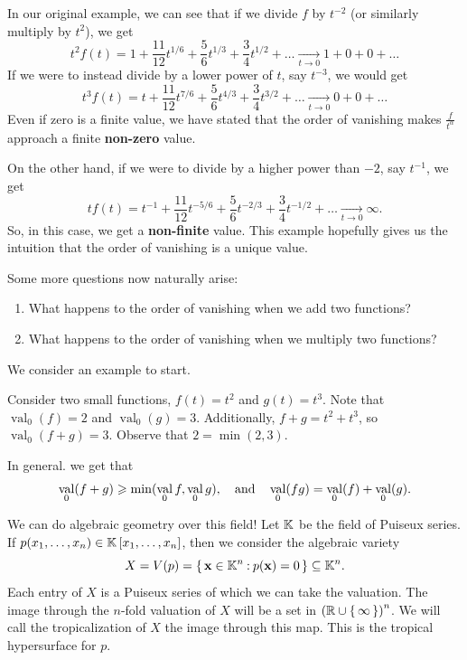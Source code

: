 \documentclass[12pt]{memoir}
\DeclareMathOperator{\val}{val}
\theoremstyle{definition}
\begin{document}
\begin{Ex}
    In our original example, we can see that if we divide $f$ by $t^{-2}$ (or similarly multiply by $t^2$), we get 
$$t^2f(t) = 1 + \frac{11}{12}t^{1/6} + \frac{5}{6}t^{1/3} + \frac{3}{4}t^{1/2} + \ldots \xrightarrow[t\to0]{} 1 + 0 + 0 + \ldots$$
If we were to instead divide by a lower power of $t$, say $t^{-3}$, we would get 
$$t^3f(t) = t + \frac{11}{12}t^{7/6} + \frac{5}{6}t^{4/3} + \frac{3}{4}t^{3/2} + \ldots \xrightarrow[t\to0]{} 0 + 0 + \ldots$$
Even if zero is a finite value, we have stated that the order of vanishing makes $\frac{f}{t^\alpha}$ approach a finite \textbf{non-zero} value.\par 
On the other hand, if we were to divide by a higher power than $-2$, say $t^{-1}$, we get 
$$tf(t) = t^{-1} + \frac{11}{12}t^{-5/6} + \frac{5}{6}t^{-2/3} + \frac{3}{4}t^{-1/2} + \ldots \xrightarrow[t\to0]{} \infty.$$
So, in this case, we get a \textbf{non-finite} value. This example hopefully gives us the intuition that the order of vanishing is a unique value.

\end{Ex}

Some more questions now naturally arise: 
\begin{enumerate}
    \item What happens to the order of vanishing when we add two functions?
    \item What happens to the order of vanishing when we multiply two functions? 
\end{enumerate}

We consider an example to start. 

\begin{Ex}
    Consider two small functions, $f(t)=t^2$ and $g(t)=t^3$. Note that $\val_0(f) = 2$ and $\val_0(g) = 3$. 
    Additionally, $f+g=t^2+t^3$, so $\val_0(f+g) = 3.$ Observe that $2=\min(2,3)$.
\end{Ex}


In general. we get that
$$\val_0(f+g)\geq\min(\val_0 f,\val_0 g),\word{and}\val_0(fg)=\val_0(f)+\val_0(g).$$

We can do algebraic geometry over this field! Let $\mathbb{K}$ be the field of Puiseux series. If $p(x_1,\dots,x_n)\in \mathbb{K}\left\lbrack x_1,\dots,x_n\right\rbrack$, then we consider the algebraic variety
$$X=V(p)=\{\,\mathbf{x}\in\mathbb{K}^n\mathbin{:}p(\mathbf{x})=0\,\}\subseteq \mathbb{K}^n.$$
Each entry of $X$ is a Puiseux series of which we can take the valuation. The image through the $n$-fold valuation of $X$ will be a set in $\left(\mathbb{R}\cup\{\,\infty\,\}\right)^n$. We will call the tropicalization of $X$ the image through this map. This is the tropical hypersurface for $p$.
\end{document}
